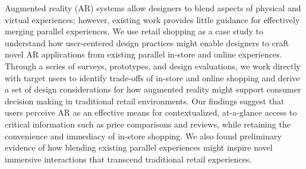 Augmented reality (AR) systems allow designers to blend aspects of physical and virtual experiences; however, existing work provides little guidance for effectively merging parallel experiences.  We use retail shopping as a case study to understand how user-centered design practices might enable designers to craft novel AR applications from existing parallel in-store and online experiences. Through a series of surveys, prototypes, and design evaluations, we work directly with target users to identify trade-offs of in-store and online shopping and derive a set of design considerations for how augmented reality might support consumer decision making in traditional retail environments. Our findings suggest that users perceive AR as an effective means for contextualized, at-a-glance access to critical information such as price comparisons and reviews, while retaining the convenience and immediacy of in-store shopping. We also found preliminary evidence of how blending existing parallel experiences might inspire novel immersive interactions that transcend traditional retail experiences.
